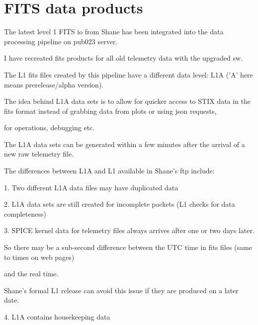 \documentclass[preprint,11pt]{elsarticle}
\begin{document}
\section{FITS data products}

The latest level 1 FITS io from Shane has been integrated into the data processing pipeline on pub023 server.

I have recreated fits products for all old telemetry data with the upgraded sw.

The L1 fits files  created by this pipeline have a different data level:  L1A ('A' here means  prerelease/alpha version).

The idea behind L1A data sets is to allow for quicker access to STIX data in the fits format instead of grabbing  data from plots or using json requests,

for operations,  debugging  etc.

The L1A data sets can be generated within a few minutes after the arrival of a new raw telemetry file.

The differences between L1A and L1 available in Shane's ftp include:

1.  Two different L1A data files may have duplicated data

2.  L1A data sets are still created for incomplete packets  (L1 checks for data completeness)

3.  SPICE kernel data for telemetry files always arrives  after one or two days later.

    So  there may be a sub-second difference between the UTC time in fits files (same to times on web pages)

   and the real time.

    Shane's formal L1 release can avoid this issue if they are produced on a later date.

4. L1A contains housekeeping data
\end{document}

